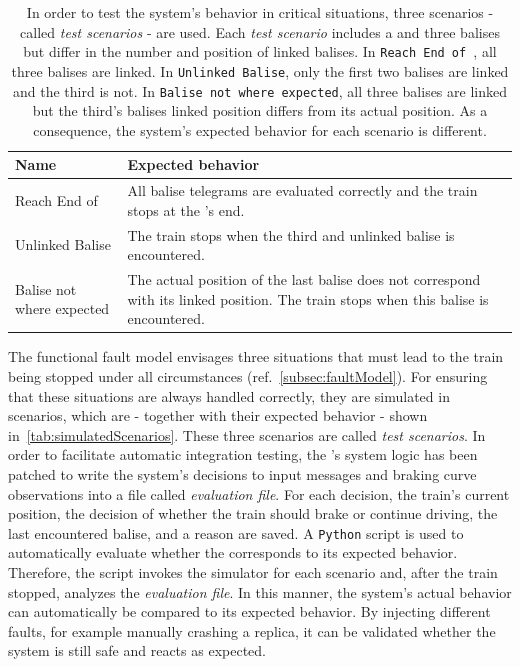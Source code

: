 \begin{table}[h!]
	\begin{center}
		\caption{In order to test the system's behavior in critical situations, three scenarios - called \textit{test scenarios} - are used. Each \textit{test scenario} includes a  and three balises but differ in the number and position of linked balises. In \texttt{Reach End of }, all three balises are linked. In \texttt{Unlinked Balise}, only the first two balises are linked and the third is not. In \texttt{Balise not where expected}, all three balises are linked but the third's balises linked position differs from its actual position. As a consequence, the system's expected behavior for each scenario is different.}
		\label{tab:simulatedScenarios}
		\begin{tabularx}{\textwidth}{|X|X|}
			\hline
			\textbf{Name} & \textbf{Expected behavior}\\
			\hline \hline
			Reach End of \abr{MA} & All balise telegrams are evaluated correctly and the train stops at the \abr{MA}'s end. \\
			\hline
			Unlinked Balise & The train stops when the third and unlinked balise is encountered. \\
			\hline
			Balise not where expected & The actual position of the last balise does not correspond with its linked position. The train stops when this balise is encountered. \\
			\hline
		\end{tabularx}
	\end{center}
\end{table}


The functional fault model envisages three situations that must lead to the train being stopped under all circumstances (ref.~\autoref{subsec:faultModel}).
For ensuring that these situations are always handled correctly, they are simulated in scenarios, which are - together with their expected behavior - shown in~\autoref{tab:simulatedScenarios}.
These three scenarios are called \textit{test scenarios}.
In order to facilitate automatic integration testing, the 's system logic has been patched to write the system's decisions to input messages and braking curve observations into a file called \textit{evaluation file}.
For each decision, the train's current position, the decision of whether the train should brake or continue driving, the last encountered balise, and a reason are saved.
A \texttt{Python} script is used to automatically evaluate whether the  corresponds to its expected behavior.
Therefore, the script invokes the simulator for each scenario and, after the train stopped, analyzes the \textit{evaluation file}.
In this manner, the system's actual behavior can automatically be compared to its expected behavior.
By injecting different faults, for example manually crashing a replica, it can be validated whether the system is still safe and reacts as expected.


